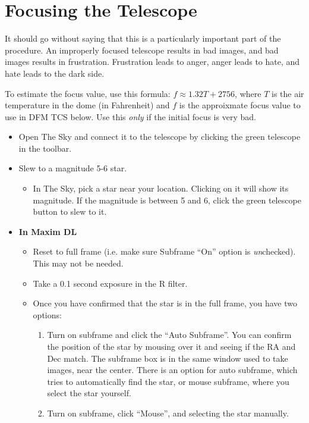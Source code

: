\documentclass[letterpaper, 12pt]{report}
\begin{document}
\newpage

\chapter{Focusing the Telescope}
\label{ch:focusing}
It should go without saying that this is a particularly important part of the procedure. An improperly focused telescope results in bad images, and bad images results in frustration. Frustration leads to anger, anger leads to hate, and hate leads to the dark side.

To estimate the focus value, use this formula: $f \approx 1.32 T + 2756$, where $T$ is the air temperature in the dome (in Fahrenheit) and $f$ is the approixmate focus value to use in DFM TCS below. Use this \emph{only} if the initial focus is very bad.

\begin{itemize}
	\item Open The Sky and connect it to the telescope by clicking the green telescope in the toolbar.
	\item Slew to a magnitude 5-6 star.
	\begin{itemize}
		\item In The Sky, pick a star near your location. Clicking on it will show its magnitude. If the magnitude is between 5 and 6, click the green telescope button to slew to it.
	\end{itemize}
	\item {\large \textbf{In Maxim DL}}
	\begin{itemize}
		\item Reset to full frame (i.e. make sure Subframe ``On'' option is \emph{un}checked). This may not be needed.
		\item Take a 0.1 second exposure in the R filter.
	\end{itemize}
	\begin{itemize}
		\item Once you have confirmed that the star is in the full frame, you have two options:
		\begin{enumerate}
			\item Turn on subframe and click the ``Auto Subframe''. You can confirm the position of the star by mousing over it and seeing if the RA and Dec match. The subframe box is in the same window used to take images, near the center. There is an option for auto subframe, which tries to automatically find the star, or mouse subframe, where you select the star yourself.
			\item Turn on subframe, click ``Mouse'', and selecting the star manually.

\end{enumerate}
\end{itemize}
\end{itemize}
\end{document}
